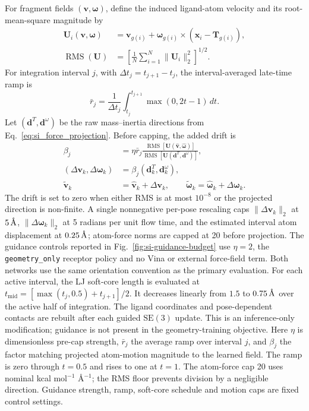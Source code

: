 \documentclass{article}
\renewcommand{\boldsymbol}[1]{\pmb{#1}}
\newcommand{\angstrom}{\text{\normalfont\AA}}
\newcommand{\SE}{\mathrm{SE}}
\begin{document}
For fragment fields \((\mathbf v,\boldsymbol\omega)\), define the induced ligand-atom velocity and its root-mean-square magnitude by
\begin{align}
    \mathbf U_i(\mathbf v,\boldsymbol\omega)
    &=\mathbf v_{g(i)}+\boldsymbol\omega_{g(i)}
      \times(\mathbf x_i-\mathbf T_{g(i)}),\\
    \operatorname{RMS}(\mathbf U)
    &=\left[\frac{1}{N}\sum_{i=1}^{N}\|\mathbf U_i\|_2^2\right]^{1/2}.
    \label{eq:si_guidance_induced_velocity}
\end{align}
For integration interval \(j\), with \(\Delta t_j=t_{j+1}-t_j\), the interval-averaged late-time ramp is
\begin{equation}
    \bar r_j=\frac{1}{\Delta t_j}
      \int_{t_j}^{t_{j+1}}\max(0,2t-1)\,dt.
    \label{eq:si_guidance_ramp}
\end{equation}
Let \((\mathbf d^T,\mathbf d^\omega)\) be the raw mass--inertia directions from Eq.~\eqref{eq:si_force_projection}.  Before capping, the added drift is
\begin{align}
    \beta_j
    &=\eta\bar r_j
      \frac{\operatorname{RMS}[\mathbf U(\widehat{\mathbf v},
        \widehat{\boldsymbol\omega})]}
           {\operatorname{RMS}[\mathbf U(\mathbf d^T,\mathbf d^\omega)]},\\
    (\Delta\mathbf v_k,\Delta\boldsymbol\omega_k)
    &=\beta_j(\mathbf d_k^T,\mathbf d_k^\omega),\\
    \widetilde{\mathbf v}_k
    &=\widehat{\mathbf v}_k+\Delta\mathbf v_k,
    \qquad
    \widetilde{\boldsymbol\omega}_k
    =\widehat{\boldsymbol\omega}_k+\Delta\boldsymbol\omega_k.
    \label{eq:si_guidance_drift}
\end{align}
The drift is set to zero when either RMS is at most \(10^{-8}\) or the projected direction is non-finite.
A single nonnegative per-pose rescaling caps \(\|\Delta\mathbf v_k\|_2\) at \(5\,\angstrom\), \(\|\Delta\boldsymbol\omega_k\|_2\) at 5 radians per unit flow time, and the estimated interval atom displacement at \(0.25\,\angstrom\); atom-force norms are capped at 20 before projection.
The guidance controls reported in Fig.~\ref{fig:si-guidance-budget} use \(\eta=2\), the \texttt{geometry\_only} receptor policy and no Vina or external force-field term. Both networks use the same orientation convention as the primary evaluation.
For each active interval, the LJ soft-core length is evaluated at \(t_{\mathrm{mid}}=[\max(t_j,0.5)+t_{j+1}]/2\). It decreases linearly from \(1.5\) to \(0.75\,\angstrom\) over the active half of integration.
The ligand coordinates and pose-dependent contacts are rebuilt after each guided \(\SE(3)\) update.
This is an inference-only modification; guidance is not present in the geometry-training objective.
Here \(\eta\) is dimensionless pre-cap strength, \(\bar r_j\) the average ramp over interval \(j\), and \(\beta_j\) the factor matching projected atom-motion magnitude to the learned field. The ramp is zero through \(t=0.5\) and rises to one at \(t=1\). The atom-force cap 20 uses nominal kcal mol\(^{-1}\) Å\(^{-1}\); the RMS floor prevents division by a negligible direction. Guidance strength, ramp, soft-core schedule and motion caps are fixed control settings.
\end{document}
